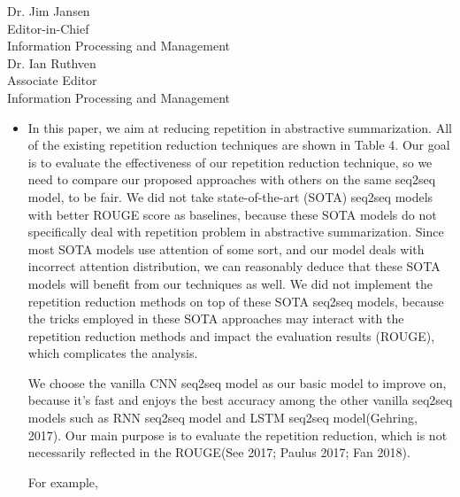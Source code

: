 \documentclass[11pt]{letter} %
\begin{document}
\begin{letter}{Dr. Jim Jansen \\
			Editor-in-Chief  \\
			Information Processing and Management\\
			Dr. Ian Ruthven \\
			Associate Editor \\
			Information Processing and Management}
\begin{enumerate}
\begin{itemize}
\begin{itemize}
				\item In this paper, we aim at reducing repetition in abstractive summarization.
                All of the existing repetition reduction techniques are shown in Table 4. 
                Our goal is to evaluate the effectiveness of our repetition reduction technique,
                so we need to compare our proposed approaches with others on the same seq2seq model, 
				to be fair.
                We did not take state-of-the-art (SOTA) seq2seq models with better ROUGE score 
				as baselines, 
				because these SOTA models 
				do not specifically deal with repetition problem in abstractive summarization.
                Since most SOTA models use attention of some sort,
                and our model deals with incorrect attention distribution, we can reasonably deduce
                that these SOTA models will benefit from our techniques as well.
				We did not implement the repetition reduction methods 
				on top of these SOTA seq2seq models, 
				because the tricks employed in these SOTA approaches may interact with the repetition 
				reduction methods and impact the evaluation results (ROUGE), 
				which complicates the analysis.
                
				\hspace*{0.6cm}
				We choose the vanilla CNN seq2seq model as our basic model to improve on,
                because it's fast and enjoys the best accuracy among the other vanilla seq2seq models 
				such as RNN seq2seq model and LSTM seq2seq model(Gehring, 2017). 
				Our main purpose is to evaluate the repetition reduction, which is not necessarily
				reflected in the ROUGE(See 2017; Paulus 2017; Fan 2018). 

                \hspace*{0.6cm}
				For example, 
				\begin{itemize}
                    

\end{itemize}
\end{itemize}
\end{itemize}
\end{enumerate}
\end{letter}
\end{document}
